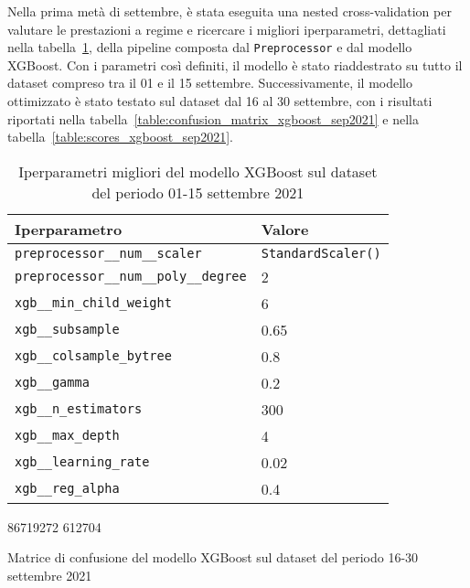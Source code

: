 Nella prima metà di settembre, è stata eseguita una nested cross-validation
per valutare le prestazioni a regime e ricercare i migliori iperparametri,
dettagliati nella tabella~\ref{table:xgb_hyperparams}, della pipeline composta
dal \texttt{Preprocessor} e dal modello XGBoost. Con i parametri così
definiti, il modello è stato riaddestrato su tutto il dataset compreso tra il
01 e il 15 settembre. Successivamente, il modello ottimizzato è stato testato
sul dataset dal 16 al 30 settembre, con i risultati riportati nella
tabella~\ref{table:confusion_matrix_xgboost_sep2021} e nella
tabella~\ref{table:scores_xgboost_sep2021}.

\begin{table}[ht]
    \centering
    \begin{tabular}{ll}
        \toprule
        \textbf{Iperparametro} & \textbf{Valore} \\
        \midrule
        \texttt{preprocessor\_\_num\_\_scaler}         & \texttt{StandardScaler()} \\
        \texttt{preprocessor\_\_num\_\_poly\_\_degree} & 2 \\
        \texttt{xgb\_\_min\_child\_weight}             & 6 \\
        \texttt{xgb\_\_subsample}                      & 0.65 \\
        \texttt{xgb\_\_colsample\_bytree}              & 0.8 \\
        \texttt{xgb\_\_gamma}                          & 0.2 \\
        \texttt{xgb\_\_n\_estimators}                  & 300 \\
        \texttt{xgb\_\_max\_depth}                     & 4 \\
        \texttt{xgb\_\_learning\_rate}                 & 0.02 \\
        \texttt{xgb\_\_reg\_alpha}                     & 0.4 \\
        \bottomrule
    \end{tabular}
    \caption{\small Iperparametri migliori del modello XGBoost sul dataset del
    periodo 01-15 settembre 2021}
    \label{table:xgb_hyperparams}
\end{table}

\begin{table}[!ht]
   \centering
   \confusionmatrix%
   {86719}{272}%
   {612}{704}
   \caption{\small Matrice di confusione del modello XGBoost sul dataset del periodo 16-30
   settembre 2021}
   \label{table:confusion_matrix_xgboost_sep2021}
\end{table}

